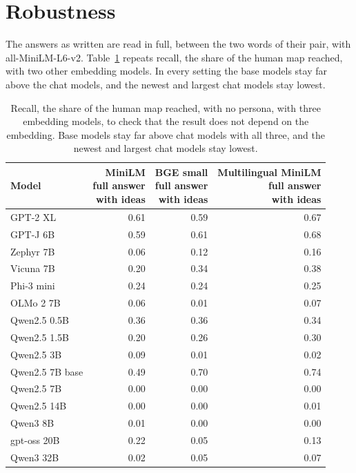 \section{Robustness}\label{app:robust}
The answers as written are read in full, between the two words of their pair, with all-MiniLM-L6-v2. Table~\ref{tab:robust} repeats recall, the share of the human map reached, with two other embedding models. In every setting the base models stay far above the chat models, and the newest and largest chat models stay lowest.
\begin{table}[h]\centering\small\begin{tabular}{lrrr}\toprule
Model & \shortstack{MiniLM\\full answer\\with ideas} & \shortstack{BGE small\\full answer\\with ideas} & \shortstack{Multilingual MiniLM\\full answer\\with ideas} \\ \midrule
GPT-2 XL & 0.61 & 0.59 & 0.67 \\
GPT-J 6B & 0.59 & 0.61 & 0.68 \\
Zephyr 7B & 0.06 & 0.12 & 0.16 \\
Vicuna 7B & 0.20 & 0.34 & 0.38 \\
Phi-3 mini & 0.24 & 0.24 & 0.25 \\
OLMo 2 7B & 0.06 & 0.01 & 0.07 \\
Qwen2.5 0.5B & 0.36 & 0.36 & 0.34 \\
Qwen2.5 1.5B & 0.20 & 0.26 & 0.30 \\
Qwen2.5 3B & 0.09 & 0.01 & 0.02 \\
Qwen2.5 7B base & 0.49 & 0.70 & 0.74 \\
Qwen2.5 7B & 0.00 & 0.00 & 0.00 \\
Qwen2.5 14B & 0.00 & 0.00 & 0.01 \\
Qwen3 8B & 0.01 & 0.00 & 0.00 \\
gpt-oss 20B & 0.22 & 0.05 & 0.13 \\
Qwen3 32B & 0.02 & 0.05 & 0.07 \\
\bottomrule\end{tabular}\caption{Recall, the share of the human map reached, with no persona, with three embedding models, to check that the result does not depend on the embedding. Base models stay far above chat models with all three, and the newest and largest chat models stay lowest.}\label{tab:robust}\end{table}
